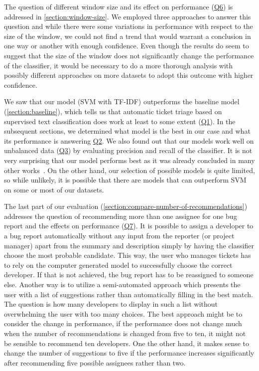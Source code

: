 The question of different window size and its effect on performance (\hyperlink{question:6}{Q6}) is addressed in \autoref{section:window-size}. We employed three approaches to answer this question and while there were some variations in performance with respect to the size of the window, we could not find a trend that would warrant a conclusion in one way or another with enough confidence. Even though the results do seem to suggest that the size of the window does not significantly change the performance of the classifier, it would be necessary to do a more thorough analysis with possibly different approaches on more datasets to adopt this outcome with higher confidence.

We saw that our model (SVM with TF-IDF) outperforms the baseline model (\autoref{section:baseline}), which tells us that automatic ticket triage based on supervised text classification does work at least to some extent (\hyperlink{question:1}{Q1}). In the subsequent sections, we determined what model is the best in our case and what its performance is answering \hyperlink{question:2}{Q2}. We also found out that our models work well on unbalanced data (\hyperlink{question:3}{Q3}) by evaluating precision and recall of the classifier. It is not very surprising that our model performs best as it was already concluded in many other works~\cite{Anvik2006}\cite{Ahsan2009}\cite{Somasundaram2012}. On the other hand, our selection of possible models is quite limited, so while unlikely, it is possible that there are models that can outperform SVM on some or most of our datasets.

The last part of our evaluation (\autoref{section:compare-number-of-recommendations}) addresses the question of recommending more than one assignee for one bug report and the effects on performance (\hyperlink{question:7}{Q7}). It is possible to assign a developer to a bug report automatically without any input from the reporter (or project manager) apart from the summary and description simply by having the classifier choose the most probable candidate. This way, the user who manages tickets has to rely on the computer generated model to successfully choose the correct developer. If that is not achieved, the bug report has to be reassigned to someone else. Another way is to utilize a semi-automated approach which presents the user with a list of suggestions rather than automatically filling in the best match. The question is how many developers to display in such a list without overwhelming the user with too many choices. The best approach might be to consider the change in performance, if the performance does not change much when the number of recommendations is changed from five to ten, it might not be sensible to recommend ten developers. One the other hand, it makes sense to change the number of suggestions to five if the performance increases significantly after recommending five possible assignees rather than two.

